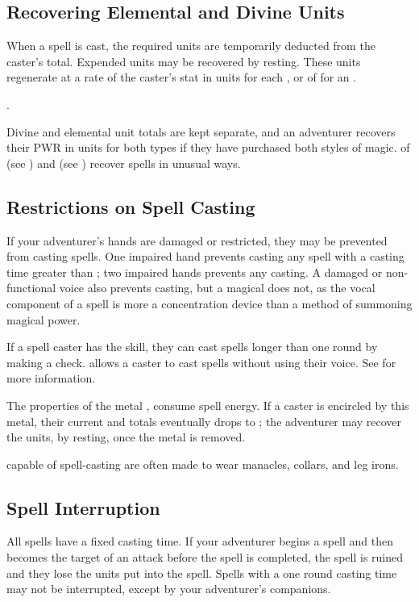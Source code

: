 \begin{multicols*}{2}
\subsection{Recovering Elemental and Divine Units}
When a spell is cast, the required units are temporarily deducted from the caster's total. Expended units may be recovered by resting. These units regenerate at a rate of the caster's \PWR stat in units for each  , or  of  for an .

. 

Divine and elemental unit totals are kept separate, and an adventurer recovers their PWR in units for both types if they have purchased both styles of magic.  of  (see ) and  (see ) recover spells in unusual ways.
\subsection{Restrictions on Spell Casting}
If your adventurer's hands are damaged or restricted, they may be prevented from casting spells. One impaired hand prevents casting any spell with a casting time greater than ; two impaired hands prevents any casting. A damaged or non-functional voice also prevents casting, but a magical  does not, as the vocal component of a spell is more a concentration device than a method of summoning magical power. 

If a spell caster has the  skill, they can cast spells longer than one round by making a check.  allows a caster to cast spells without using their voice. See  for more information.

The properties of the metal , consume spell energy. If a caster is encircled by this metal, their current \EU and \DU totals eventually drops to ; the adventurer may recover the units, by resting, once the metal is removed. 

 capable of spell-casting are often made to wear manacles, collars, and leg irons.
\subsection{Spell Interruption}
All spells have a fixed casting time. If your adventurer begins a spell and then becomes the target of an attack before the spell is completed, the spell is ruined and they lose the units put into the spell. Spells with a one round casting time may not be interrupted, except by your adventurer's companions. 


\end{multicols*}
